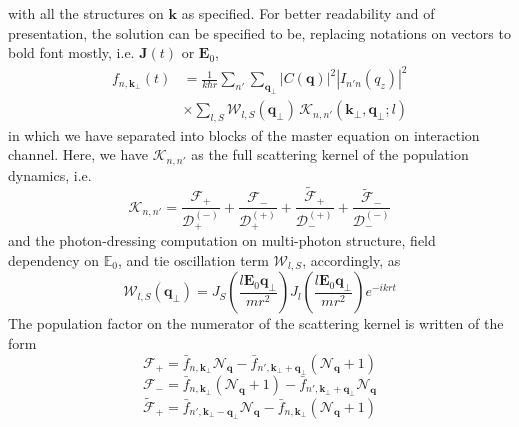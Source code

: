 \documentclass[%
 reprint,
 amsmath,amssymb,
 aps,
]{revtex4-2}
\begin{document}
with all the structures on $\mathbf{k}$ as specified. For better readability and of presentation, the solution can be specified to be, replacing notations on vectors to bold font mostly, i.e. $\mathbf{J}(t)$ or $\mathbf{E}_{0}$,
\begin{equation}
\begin{split}
f_{n,\mathbf{k}_{\perp}}(t)
&=
\frac{1}{k\hbar r}
\sum_{n'}
\sum_{\mathbf{q}_{\perp}}
\left|C(\mathbf{q})\right|^2
\left|I_{n'n}(q_z)\right|^2\\
&\times \sum_{l,S}
\mathcal{W}_{l,S}(\mathbf{q}_{\perp})
\,
\mathcal{K}_{n,n'}(\mathbf{k}_{\perp},\mathbf{q}_{\perp};l)
\end{split}
\end{equation}
in which we have separated into blocks of the master equation on interaction channel. Here, we have $\mathcal{K}_{n,n'}$ as the full scattering kernel of the population dynamics, i.e. 
\begin{equation}
\mathcal{K}_{n,n'}
=
\frac{\mathcal{F}_{+}}
{\mathcal{D}_{+}^{(-)}}
+
\frac{\mathcal{F}_{-}}
{\mathcal{D}_{+}^{(+)}}
+
\frac{\widetilde{\mathcal{F}}_{+}}
{\mathcal{D}_{-}^{(+)}}
+
\frac{\widetilde{\mathcal{F}}_{-}}
{\mathcal{D}_{-}^{(-)}}
\end{equation}
and the photon-dressing computation on multi-photon structure, field dependency on $\mathbb{E}_{0}$, and tie oscillation term $\mathcal{W}_{l,S}$, accordingly, as
\begin{equation}
\mathcal{W}_{l,S}(\mathbf{q}_{\perp})
=
J_S\!\left(\frac{l\mathbf{E}_0\mathbf{q}_{\perp}}{mr^2}\right)
J_l\!\left(\frac{l\mathbf{E}_0\mathbf{q}_{\perp}}{mr^2}\right)
e^{-ikrt}
\end{equation}
The population factor on the numerator of the scattering kernel is written of the form
\begin{equation}
\mathcal{F}_{+}
=
\bar f_{n,\mathbf{k}_{\perp}}\mathcal N_{\mathbf q}
-
\bar f_{n',\mathbf{k}_{\perp}+\mathbf q_{\perp}}
(\mathcal N_{\mathbf q}+1)
\end{equation}
\begin{equation}
\mathcal{F}_{-}
=
\bar f_{n,\mathbf{k}_{\perp}}(\mathcal N_{\mathbf q}+1)
-
\bar f_{n',\mathbf{k}_{\perp}+\mathbf q_{\perp}}
\mathcal N_{\mathbf q}
\end{equation}
\begin{equation}
\widetilde{\mathcal{F}}_{+}
=
\bar f_{n',\mathbf{k}_{\perp}-\mathbf q_{\perp}}
\mathcal N_{\mathbf q}
-
\bar f_{n,\mathbf{k}_{\perp}}
(\mathcal N_{\mathbf q}+1)
\end{equation}
\end{document}
